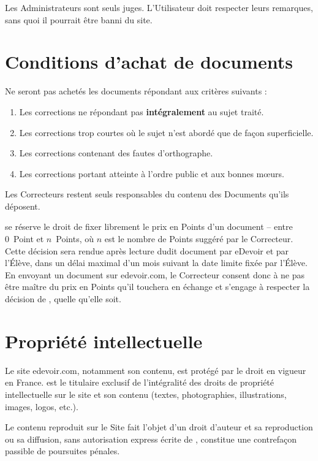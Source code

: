 Les Administrateurs sont seuls juges. L'Utilisateur doit respecter leurs remarques, sans quoi il pourrait être banni du site.


\section{Conditions d'achat de documents}

Ne seront pas achetés les documents répondant aux critères suivants :
\begin{enumerate}
   \item Les corrections ne répondant pas \textbf{intégralement} au sujet traité.
   \item Les corrections trop courtes où le sujet n'est abordé que de façon superficielle.
   \item Les corrections contenant des fautes d'orthographe.
   \item Les corrections portant atteinte à l'ordre public et aux bonnes mœurs.
\end{enumerate}

Les Correcteurs restent seuls responsables du contenu des Documents qu'ils déposent.

\eDevoir se réserve le droit de fixer librement le prix en Points d'un document -- entre 0~Point et $n$~Points, où $n$ est le nombre de Points suggéré par le Correcteur. Cette décision sera rendue après lecture dudit document par eDevoir et par l'Élève, dans un délai maximal d'un mois suivant la date limite fixée par l'Élève. En envoyant un document sur edevoir.com, le Correcteur consent donc à ne pas être maître du prix en Points qu'il touchera en échange et s'engage à respecter la décision de \eDevoir, quelle qu'elle soit.


\section{Propriété intellectuelle}

Le site edevoir.com, notamment son contenu, est protégé par le droit en vigueur en France. \eDevoir est le titulaire exclusif de l'intégralité des droits de propriété intellectuelle sur le site et son contenu (textes, photographies, illustrations, images, logos, etc.).

Le contenu reproduit sur le Site fait l'objet d'un droit d'auteur et sa reproduction ou sa diffusion, sans autorisation express écrite de \eDevoir, constitue une contrefaçon passible de poursuites pénales.

